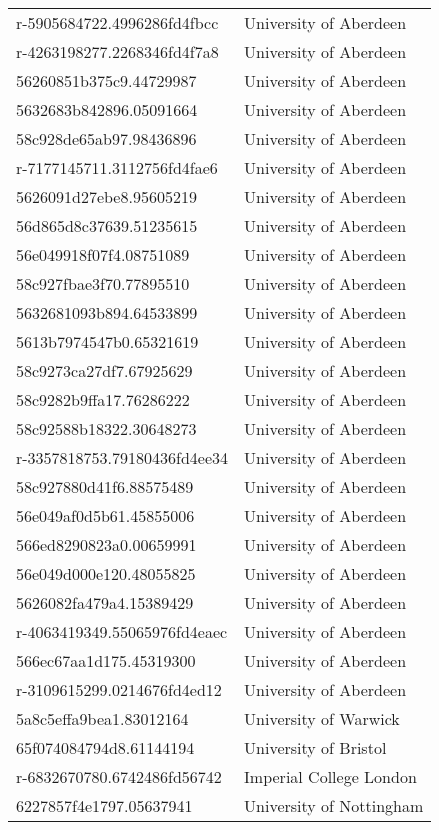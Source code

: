 \begin{tabular}{ll}
r-5905684722.4996286fd4fbcc & University of Aberdeen \\
r-4263198277.2268346fd4f7a8 & University of Aberdeen \\
56260851b375c9.44729987 & University of Aberdeen \\
5632683b842896.05091664 & University of Aberdeen \\
58c928de65ab97.98436896 & University of Aberdeen \\
r-7177145711.3112756fd4fae6 & University of Aberdeen \\
5626091d27ebe8.95605219 & University of Aberdeen \\
56d865d8c37639.51235615 & University of Aberdeen \\
56e049918f07f4.08751089 & University of Aberdeen \\
58c927fbae3f70.77895510 & University of Aberdeen \\
5632681093b894.64533899 & University of Aberdeen \\
5613b7974547b0.65321619 & University of Aberdeen \\
58c9273ca27df7.67925629 & University of Aberdeen \\
58c9282b9ffa17.76286222 & University of Aberdeen \\
58c92588b18322.30648273 & University of Aberdeen \\
r-3357818753.79180436fd4ee34 & University of Aberdeen \\
58c927880d41f6.88575489 & University of Aberdeen \\
56e049af0d5b61.45855006 & University of Aberdeen \\
566ed8290823a0.00659991 & University of Aberdeen \\
56e049d000e120.48055825 & University of Aberdeen \\
5626082fa479a4.15389429 & University of Aberdeen \\
r-4063419349.55065976fd4eaec & University of Aberdeen \\
566ec67aa1d175.45319300 & University of Aberdeen \\
r-3109615299.0214676fd4ed12 & University of Aberdeen \\
5a8c5effa9bea1.83012164 & University of Warwick \\
65f074084794d8.61144194 & University of Bristol \\
r-6832670780.6742486fd56742 & Imperial College London \\
6227857f4e1797.05637941 & University of Nottingham \\

\end{tabular}

